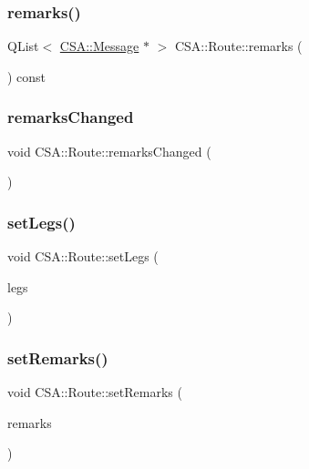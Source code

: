 \subsubsection{\texorpdfstring{remarks()}{remarks()}}
{\footnotesize\ttfamily Q\+List$<$ \mbox{\hyperlink{classCSA_1_1Message}{C\+S\+A\+::\+Message}} $\ast$ $>$ C\+S\+A\+::\+Route\+::remarks (\begin{DoxyParamCaption}{ }\end{DoxyParamCaption}) const}

\mbox{\label{classCSA_1_1Route_ab31ce6bceb5dca29f7f74719e50e07df}} 
\subsubsection{\texorpdfstring{remarks\+Changed}{remarksChanged}}
{\footnotesize\ttfamily void C\+S\+A\+::\+Route\+::remarks\+Changed (\begin{DoxyParamCaption}{ }\end{DoxyParamCaption})\hspace{0.3cm}{\ttfamily [signal]}}

\mbox{\label{classCSA_1_1Route_acae4554ffa830193e2edbd8936842551}} 
\subsubsection{\texorpdfstring{set\+Legs()}{setLegs()}}
{\footnotesize\ttfamily void C\+S\+A\+::\+Route\+::set\+Legs (\begin{DoxyParamCaption}\item[{const Q\+List$<$ \mbox{\hyperlink{classCSA_1_1RouteLeg}{Route\+Leg}} $\ast$$>$ \&}]{legs }\end{DoxyParamCaption})}

\mbox{\label{classCSA_1_1Route_a285384451bf966a13649e38762205026}} 
\subsubsection{\texorpdfstring{set\+Remarks()}{setRemarks()}}
{\footnotesize\ttfamily void C\+S\+A\+::\+Route\+::set\+Remarks (\begin{DoxyParamCaption}\item[{const Q\+List$<$ \mbox{\hyperlink{classCSA_1_1Message}{C\+S\+A\+::\+Message}} $\ast$$>$ \&}]{remarks }\end{DoxyParamCaption})}


